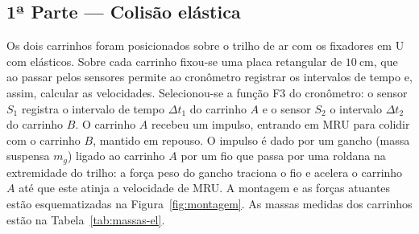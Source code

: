 \documentclass[12pt,a4paper]{article}
\begin{document}
\subsection{1ª Parte --- Colisão elástica}
Os dois carrinhos foram posicionados sobre o trilho de ar com os fixadores em U com elásticos.
Sobre cada carrinho fixou-se uma placa retangular de $10~\mathrm{cm}$, que ao passar pelos
sensores permite ao cronômetro registrar os intervalos de tempo e, assim, calcular as
velocidades. Selecionou-se a função F3 do cronômetro: o sensor $S_1$ registra o intervalo de
tempo $\Delta t_1$ do carrinho $A$ e o sensor $S_2$ o intervalo $\Delta t_2$ do carrinho $B$. O
carrinho $A$ recebeu um impulso, entrando em MRU para colidir com o carrinho $B$, mantido em
repouso. O impulso é dado por um gancho (massa suspensa $m_g$) ligado ao carrinho $A$ por um fio
que passa por uma roldana na extremidade do trilho: a força peso do gancho traciona o fio e
acelera o carrinho $A$ até que este atinja a velocidade de MRU. A montagem e as forças atuantes
estão esquematizadas na Figura~\ref{fig:montagem}. As massas medidas dos carrinhos estão na
Tabela~\ref{tab:massas-el}.
\end{document}

